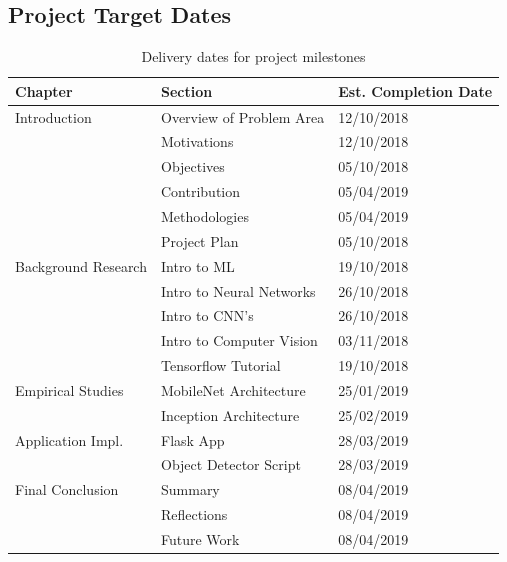 \documentclass[12pt]{report}
\begin{document}
\subsection{Project Target Dates}
\begin{table}[ht!]
\begin{tabular}{|l|l|l|}
\hline
Chapter                   & Section                  & Est. Completion Date \\ \hline
Introduction              & Overview of Problem Area & 12/10/2018           \\ \hline
                          & Motivations              & 12/10/2018           \\ \hline
                          & Objectives               & 05/10/2018           \\ \hline
                          & Contribution             & 05/04/2019           \\ \hline
                          & Methodologies            & 05/04/2019           \\ \hline
                          & Project Plan             & 05/10/2018           \\ \hline
Background Research       & Intro to ML              & 19/10/2018           \\ \hline
                          & Intro to Neural Networks & 26/10/2018           \\ \hline
                          & Intro to CNN's           & 26/10/2018           \\ \hline
                          & Intro to Computer Vision & 03/11/2018           \\ \hline
                          & Tensorflow Tutorial      & 19/10/2018           \\ \hline          
Empirical Studies         & MobileNet Architecture   & 25/01/2019           \\ \hline
                          & Inception Architecture   & 25/02/2019           \\ \hline                   
Application Impl.         & Flask App                & 28/03/2019           \\ \hline
                          & Object Detector Script   & 28/03/2019           \\ \hline         
Final Conclusion          & Summary                  & 08/04/2019           \\ \hline
                          & Reflections              & 08/04/2019           \\ \hline
                          & Future Work              & 08/04/2019           \\ \hline                          
\end{tabular}
\caption{Delivery dates for project milestones}
\end{table}
\end{document}
